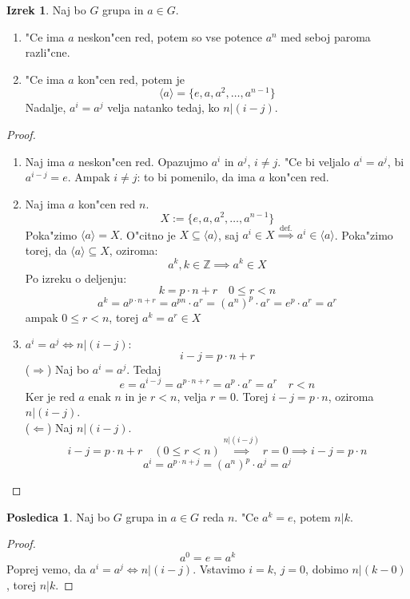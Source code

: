 \documentclass[11pt, a4paper]{article}
\theoremstyle{definition}
\newtheorem{conseq}[counter]{Posledica}
\newtheorem{theorem}[counter]{Izrek}
\theoremstyle{remark}
\newcommand{\Z}{\mathbb{Z}}
\begin{document}
	\begin{theorem}
		Naj bo $G$ grupa in $a \in G$.
		
		\begin{enumerate}
			\item "Ce ima $a$ neskon"cen red, potem so vse potence $a^n$ med seboj paroma razli"cne.
			\item "Ce ima $a$ kon"cen red, potem je
			\[ \langle a \rangle = \lbrace e, a, a^2, \ldots, a^{n-1} \rbrace \]
			Nadalje, $a^i = a^j$ velja natanko tedaj, ko $n | (i-j)$.
		\end{enumerate}
	\end{theorem}
	\begin{proof}$ $
		\begin{enumerate}
			\item Naj ima $a$ neskon"cen red. Opazujmo $a^i$ in $a^j$, $i \neq j$. "Ce bi veljalo $a^i = a^j$, bi $a^{i-j} = e$. Ampak $i \neq j$: to bi pomenilo, da ima $a$ kon"cen red.
		
			\item Naj ima $a$ kon"cen red $n$.
			\[ X := \lbrace e, a, a^2, \ldots, a^{n-1} \rbrace \]
			Poka"zimo $\langle a \rangle = X$.
			O"citno je $X \subseteq \langle a \rangle $, saj $a^i \in X \overset{\text{def.}}{\implies} a^i \in \langle a \rangle $.
			Poka"zimo torej, da $ \langle a \rangle \subseteq X$, oziroma:
			\[ a^k, k \in \Z \implies a^k \in X \]
			Po izreku o deljenju:
			\[ k = p \cdot n+r \quad 0 \leq r < n \]
			\[ a^k = a^{p \cdot n+r} = a^{pn} \cdot a^r = (a^n)^p \cdot a^r = e^p \cdot a^r = a^r \]
			ampak $ 0 \leq r < n $, torej $a^k = a^r \in X $
			
			\item $a^i = a^j \iff n | (i-j)$:
			\[ i-j = p \cdot n + r \]
			($\Rightarrow$) Naj bo $a^i = a^j$. Tedaj
			\[ e = a^{i-j} = a^{p \cdot n + r} = a^p \cdot a^r = a^r \quad r < n \]
			Ker je red $a$ enak $n$ in je $r < n$, velja $r = 0$. Torej $i-j = p \cdot n$, oziroma $n | (i-j)$. \\
			
			($\Leftarrow$) Naj $n | (i-j)$.
			\[ i-j = p \cdot n + r \quad (0 \leq r < n) \overset{n | (i-j)}{\implies} r = 0 \implies i-j=p \cdot n\]
			\[ a^i = a^{p \cdot n + j} = (a^n)^p \cdot a^j = a^j \]
		\end{enumerate}
	\end{proof}

	\begin{conseq}
		Naj bo $G$ grupa in $a \in G$ reda $n$. "Ce $a^k = e$, potem $n | k$.
	\end{conseq}
	\begin{proof}
		\[ a^0 = e = a^k \]
		Poprej vemo, da $a^i = a^j \iff n | (i-j)$. Vstavimo $i=k$, $j=0$, dobimo $n | (k-0)$, torej $n | k$.
	\end{proof}
\end{document}
